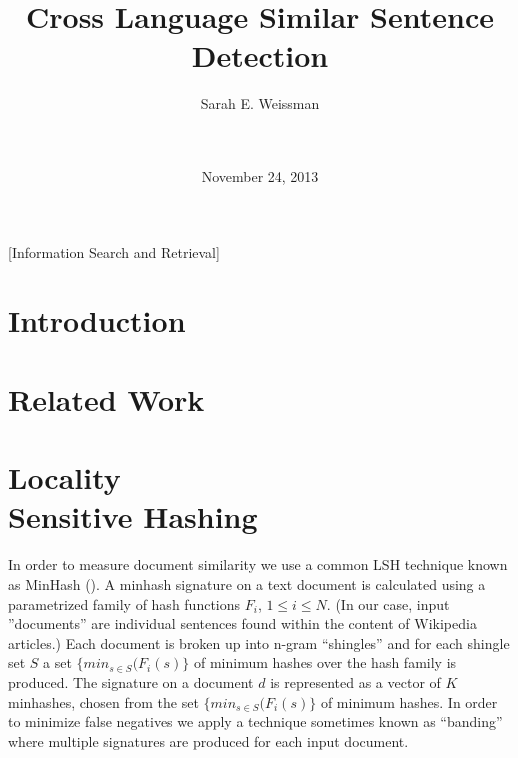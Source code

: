 \documentclass{acm_proc_article-sp}
\begin{document}
\title{Cross Language Similar Sentence Detection}


\author{
\alignauthor Sarah E. Weissman\\
       \\
       \\
}

\date{November 24, 2013}

\maketitle
\begin{abstract}
\end{abstract}

[Information Search and Retrieval]


\section{Introduction}

\section{Related Work}

\section{Locality \\ Sensitive Hashing}

In order to measure document similarity we use a common LSH technique known as MinHash (\cite{broder:resemblance}). A minhash signature on a text document is calculated using a parametrized family of hash functions $F_i$, $1 \le i \le N$. (In our case, input ''documents'' are individual sentences found within the content of Wikipedia articles.) Each document is broken up into n-gram ``shingles'' and for each shingle set $S$ a set $\{min_{s \in S}(F_i(s)\}$ of minimum hashes over the hash family is produced. The signature on a document $d$ is represented as a vector of $K$ minhashes, chosen from the set $\{min_{s \in S}(F_i(s)\}$ of minimum hashes. In order to minimize false negatives we apply a technique sometimes known as ``banding'' \cite{ullman:massive} where multiple signatures are produced for each input document.
\end{document}
